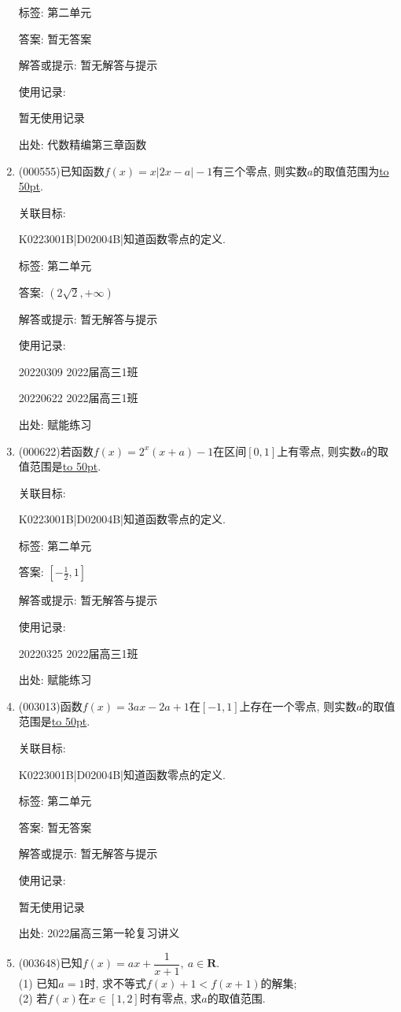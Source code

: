 \documentclass[10pt,a4paper]{article}
\newcommand{\blank}[1]{\underline{\hbox to #1pt{}}}
\begin{document}
\begin{enumerate}[1.]
标签: 第二单元

答案: 暂无答案

解答或提示: 暂无解答与提示

使用记录:

暂无使用记录


出处: 代数精编第三章函数
\item { (000555)}已知函数$f(x)=x|2x-a|-1$有三个零点, 则实数$a$的取值范围为\blank{50}.


关联目标:

K0223001B|D02004B|知道函数零点的定义.



标签: 第二单元

答案: $(2\sqrt 2,+\infty)$

解答或提示: 暂无解答与提示

使用记录:

20220309	2022届高三1班	

20220622	2022届高三1班  	


出处: 赋能练习
\item { (000622)}若函数$f(x)=2^x(x+a)-1$在区间$[0,1]$上有零点, 则实数$a$的取值范围是\blank{50}.


关联目标:

K0223001B|D02004B|知道函数零点的定义.



标签: 第二单元

答案: $[-\frac 12,1]$

解答或提示: 暂无解答与提示

使用记录:

20220325	2022届高三1班	


出处: 赋能练习
\item { (003013)}函数$f(x)=3ax-2a+1$在$[-1,1]$上存在一个零点, 则实数$a$的取值范围是\blank{50}.


关联目标:

K0223001B|D02004B|知道函数零点的定义.



标签: 第二单元

答案: 暂无答案

解答或提示: 暂无解答与提示

使用记录:

暂无使用记录


出处: 2022届高三第一轮复习讲义
\item { (003648)}已知$f(x)=ax+\dfrac{1}{x+1}, \ a\in \mathbf{R}$.\\
(1) 已知$a=1$时, 求不等式$f(x)+1<f(x+1)$的解集;\\
(2) 若$f(x)$在$x\in [1,2]$时有零点, 求$a$的取值范围.



\end{enumerate}
\end{document}
